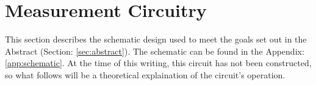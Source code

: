 \section {Measurement Circuitry}
\label{sec:measCirc}
This section describes the schematic design used to meet the goals set out in the Abstract (Section: \ref{sec:abstract}). The schematic can be found in the Appendix: \ref{app:schematic}. At the time of this writing, this circuit has not been constructed, so what follows will be a theoretical explaination of the circuit's operation.

\nocite{my_ieeePaper}










